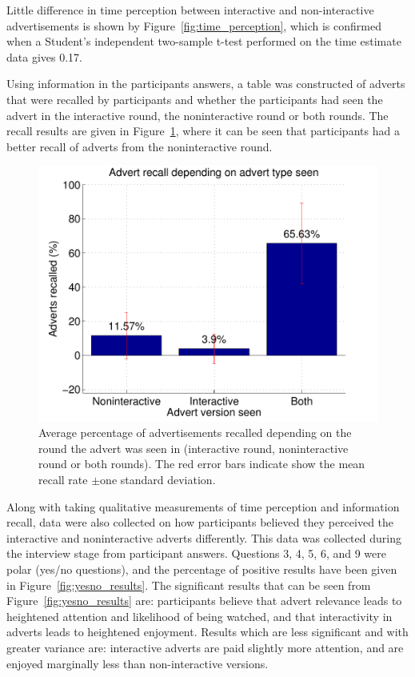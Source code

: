 	Little difference in time perception between interactive and non-interactive advertisements is shown by Figure~\ref{fig:time_perception}, which is confirmed when a Student's independent two-sample t-test performed on the time estimate data gives 0.17.

	Using information in the participants answers, a table was constructed of adverts that were recalled by participants and whether the participants had seen the advert in the interactive round, the noninteractive round or both rounds. The recall results are given in Figure~\ref{fig:recall}, where it can be seen that participants had a better recall of adverts from the noninteractive round. 
	\begin{figure}[h!]
		\centering
		\includegraphics[width=\textwidth]{images/recall.pdf}
		\caption{Average percentage of advertisements recalled depending on the round the advert was seen in (interactive round, noninteractive round or both rounds). The red error bars indicate show the mean recall rate $\pm$one standard deviation.}
		\label{fig:recall}
	\end{figure}

	Along with taking qualitative measurements of time perception and information recall, data were also collected on how participants believed they perceived the interactive and noninteractive adverts differently. This data was collected during the interview stage from participant answers. Questions 3, 4, 5, 6, and 9 were polar (yes/no questions), and the percentage of positive results have been given in Figure~\ref{fig:yesno_results}. The significant results that can be seen from Figure~\ref{fig:yesno_results} are: participants believe that advert relevance leads to heightened attention and likelihood of being watched, and that interactivity in adverts leads to heightened enjoyment. Results which are less significant and with greater variance are: interactive adverts are paid slightly more attention, and are enjoyed marginally less than non-interactive versions.

